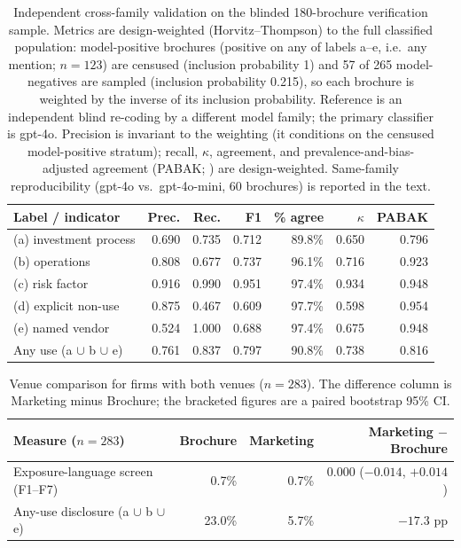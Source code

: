 \documentclass[utf8]{FrontiersinHarvard}
\begin{document}
\begin{table}[h!]
\caption{Independent cross-family validation on the blinded 180-brochure verification sample. Metrics are design-weighted (Horvitz--Thompson) to the full classified population: model-positive brochures (positive on any of labels a--e, i.e.\ any mention; $n = 123$) are censused (inclusion probability 1) and 57 of 265 model-negatives are sampled (inclusion probability 0.215), so each brochure is weighted by the inverse of its inclusion probability. Reference is an independent blind re-coding by a different model family; the primary classifier is gpt-4o. Precision is invariant to the weighting (it conditions on the censused model-positive stratum); recall, $\kappa$, agreement, and prevalence-and-bias-adjusted agreement (PABAK; \citealp{byrt1993}) are design-weighted. Same-family reproducibility (gpt-4o vs.\ gpt-4o-mini, 60 brochures) is reported in the text.}
\label{tab:validation}
\centering
\small
\begin{tabular}{lrrrrrr}
\toprule
Label / indicator & Prec. & Rec. & F1 & \% agree & $\kappa$ & PABAK \\
\midrule
(a) investment process & 0.690 & 0.735 & 0.712 & 89.8\% & 0.650 & 0.796 \\
(b) operations & 0.808 & 0.677 & 0.737 & 96.1\% & 0.716 & 0.923 \\
(c) risk factor & 0.916 & 0.990 & 0.951 & 97.4\% & 0.934 & 0.948 \\
(d) explicit non-use & 0.875 & 0.467 & 0.609 & 97.7\% & 0.598 & 0.954 \\
(e) named vendor & 0.524 & 1.000 & 0.688 & 97.4\% & 0.675 & 0.948 \\
Any use (a $\cup$ b $\cup$ e) & 0.761 & 0.837 & 0.797 & 90.8\% & 0.738 & 0.816 \\
\bottomrule
\end{tabular}
\end{table}

\begin{table}[h!]
\caption{Venue comparison for firms with both venues ($n = 283$). The difference column is Marketing minus Brochure; the bracketed figures are a paired bootstrap 95\% CI.}
\label{tab:venue}
\centering
\begin{tabular}{lrrr}
\toprule
Measure ($n = 283$) & Brochure & Marketing & Marketing $-$ Brochure \\
\midrule
Exposure-language screen (F1--F7) & 0.7\% & 0.7\% & 0.000 ($-0.014$, $+0.014$) \\
Any-use disclosure (a $\cup$ b $\cup$ e) & 23.0\% & 5.7\% & $-17.3$ pp \\
\bottomrule
\end{tabular}
\end{table}
\end{document}
